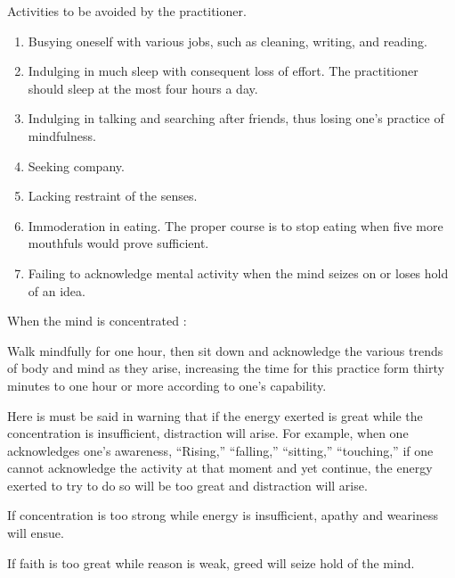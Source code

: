 \documentclass[a5paper,10pt,english]{book}
\begin{document}
\sphinxAtStartPar
Activities to be avoided by the practitioner.
\begin{enumerate}
%
\item {} 
\sphinxAtStartPar
Busying oneself with various jobs, such as cleaning, writing, and reading.

\item {} 
\sphinxAtStartPar
Indulging in much sleep with consequent loss of effort. The practitioner should sleep at the most four hours a day.

\item {} 
\sphinxAtStartPar
Indulging in talking and searching after friends, thus losing one’s practice of mindfulness.

\item {} 
\sphinxAtStartPar
Seeking company.

\item {} 
\sphinxAtStartPar
Lacking restraint of the senses.

\item {} 
\sphinxAtStartPar
Immoderation in eating. The proper course is to stop eating when five more mouthfuls would prove sufficient.

\item {} 
\sphinxAtStartPar
Failing to acknowledge mental activity when the mind seizes on or loses hold of an idea.

\end{enumerate}

\sphinxAtStartPar
When the mind is concentrated :

\sphinxAtStartPar
Walk mindfully for one hour, then sit down and acknowledge the various trends of body and mind as they arise, increasing the time for this practice form thirty minutes to one hour or more according to one’s capability.

\sphinxAtStartPar
Here is must be said in warning that if the energy exerted is great while the concentration is insufficient, distraction will arise. For example, when one acknowledges one’s awareness, “Rising,” “falling,” “sitting,” “touching,” if one cannot acknowledge the activity at that moment and yet continue, the energy exerted to try to do so will be too great and distraction will arise.

\sphinxAtStartPar
If concentration is too strong while energy is insufficient, apathy and weariness will ensue.

\sphinxAtStartPar
If faith is too great while reason is weak, greed will seize hold of the mind.
\end{document}

